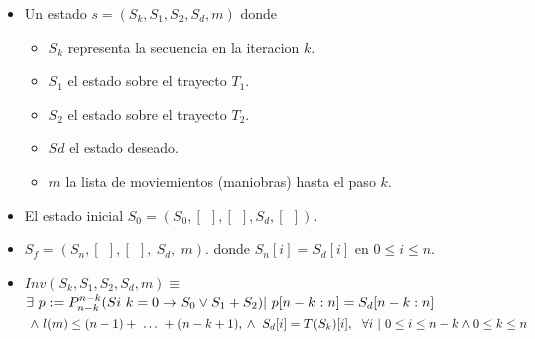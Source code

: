 \documentclass[12pt, a4paper]{article}
\begin{document}
\begin{itemize}
  \item Un estado $s=(S_k, S_1, S_2, S_d, m)$ donde
  \begin{itemize}
    \item $S_k$ representa la secuencia en la iteracion $k$.
    \item $S_1$ el estado sobre el trayecto $T_1$.
    \item $S_2$ el estado sobre el trayecto $T_2$.
    \item $Sd$ el estado deseado.
    \item $m$ la lista de moviemientos (maniobras) hasta el paso $k$.
  \end{itemize}
  \item El estado inicial $S_0=(S_0, [~~], [~~], S_d, [~~])$.
  \item $S_f=(S_n, [~~], [~~],~S_d,~ m)$. donde $S_n[i] = S_d[i]$ en $0 \leq i \leq n$.
  \item $Inv(S_k, S_1, S_2, S_d, m)\equiv$ $ \exists~p := P_{n-k}^{n-k} ( Si~k = 0 \rightarrow S_0 \lor S_1  + S_2) \\ |~p[n-k:n] = S_d[n-k:n]$ $~\land~l(m) \leq (n-1) +~\ldots~+ (n-k+1), \\ \land ~S_d[i] = T(S_k)[i],~~\forall i~|~0 \leq i \leq n-k \land 0 \leq k \leq n$ \\
  

\end{itemize}
\end{document}
